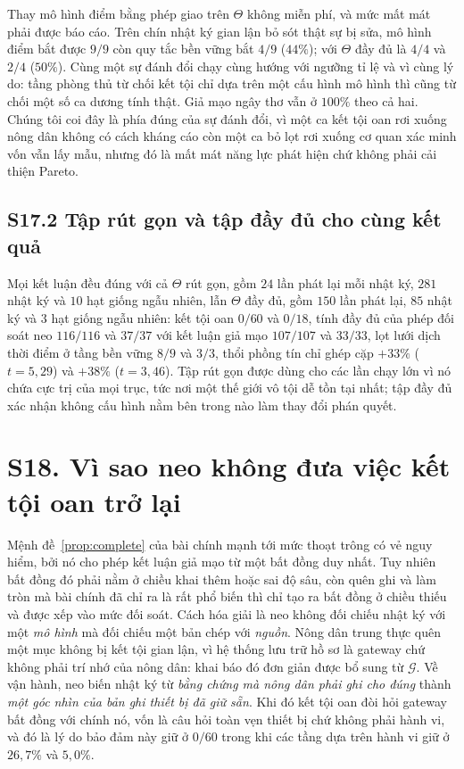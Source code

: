 Thay mô hình điểm bằng phép giao trên $\Theta$ không miễn phí, và mức mất mát phải được báo
cáo. Trên chín nhật ký gian lận bỏ sót thật sự bị sửa, mô hình điểm bắt được $9/9$ còn quy
tắc bền vững bắt $4/9$ ($44\%$); với $\Theta$ đầy đủ là $4/4$ và $2/4$ ($50\%$). Cùng một sự
đánh đổi chạy cùng hướng với ngưỡng tỉ lệ và vì cùng lý do: tầng phòng thủ từ chối kết tội
chỉ dựa trên một cấu hình mô hình thì cũng từ chối một số ca dương tính thật. Giả mạo ngây
thơ vẫn ở $100\%$ theo cả hai. Chúng tôi coi đây là phía đúng của sự đánh đổi, vì một ca kết
tội oan rơi xuống nông dân không có cách kháng cáo còn một ca bỏ lọt rơi xuống cơ quan xác
minh vốn vẫn lấy mẫu, nhưng đó là mất mát năng lực phát hiện chứ không phải cải thiện
Pareto.

\subsection*{S17.2 Tập rút gọn và tập đầy đủ cho cùng kết quả}

Mọi kết luận đều đúng với cả $\Theta$ rút gọn, gồm $24$ lần phát lại mỗi nhật ký, $281$ nhật ký
và $10$ hạt giống ngẫu nhiên, lẫn $\Theta$ đầy đủ, gồm $150$ lần phát lại, $85$ nhật ký và $3$
hạt giống ngẫu nhiên: kết tội oan $0/60$ và $0/18$, tính đầy đủ của phép đối soát neo $116/116$ và $37/37$
với kết luận giả mạo $107/107$ và $33/33$,
lọt lưới dịch thời điểm ở tầng bền vững $8/9$ và $3/3$, thổi phồng tín chỉ ghép cặp $+33\%$
($t=5{,}29$) và $+38\%$ ($t=3{,}46$). Tập rút gọn được dùng cho các lần chạy lớn vì nó chứa cực
trị của mọi trục, tức nơi một thế giới vô tội dễ tồn tại nhất; tập đầy đủ xác nhận không cấu
hình nằm bên trong nào làm thay đổi phán quyết.

\section*{S18. Vì sao neo không đưa việc kết tội oan trở lại}

Mệnh đề~\ref{prop:complete} của bài chính mạnh tới mức thoạt trông có vẻ nguy hiểm, bởi nó
cho phép kết luận giả mạo từ một bất đồng duy nhất. Tuy nhiên bất đồng đó phải nằm ở
chiều khai thêm hoặc sai độ sâu, còn quên ghi và làm tròn mà bài chính đã chỉ ra là rất
phổ biến thì chỉ tạo ra bất đồng ở chiều thiếu và được xếp vào mức đối soát.
Cách hóa giải là neo không đối chiếu nhật ký với một \emph{mô hình} mà đối chiếu một bản chép
với \emph{nguồn}. Nông dân trung thực quên một mục không bị kết tội gian lận, vì hệ thống lưu
trữ hồ sơ là gateway chứ không phải trí nhớ của nông dân: khai báo đó đơn giản được bổ sung
từ $\mathcal{G}$. Về vận hành, neo biến nhật ký từ \emph{bằng chứng mà nông dân phải ghi cho
đúng} thành \emph{một góc nhìn của bản ghi thiết bị đã giữ sẵn}. Khi đó kết tội oan đòi hỏi
gateway bất đồng với chính nó, vốn là câu hỏi toàn vẹn thiết bị chứ không phải hành vi, và đó
là lý do bảo đảm này giữ ở $0/60$ trong khi các tầng dựa trên hành vi giữ ở $26{,}7\%$ và
$5{,}0\%$.

